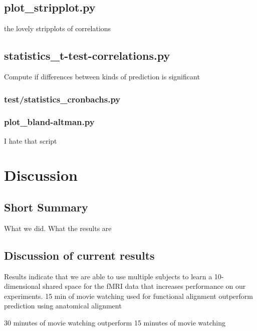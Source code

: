 

\subsection{plot\_stripplot.py}

the lovely stripplots of correlations

\subsection{statistics\_t-test-correlations.py}

Compute if differences between kinds of prediction is significant


\subsubsection{test/statistics\_cronbachs.py}

\subsubsection{plot\_bland-altman.py}

I hate that script



\section{Discussion}


\subsection{Short Summary}

What we did. What the results are

\subsection{Discussion of current results}

Results indicate that we are able to use multiple subjects to learn a
10-dimensional shared space for the fMRI data that increases performance on our
experiments.
%
15 min of movie watching used for functional alignment outperform prediction
using anatomical alignment

%
30 minutes of movie watching outperform 15 minutes of movie watching

